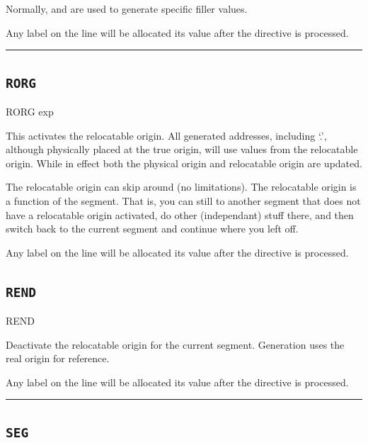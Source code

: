 Normally,  and  are used to generate specific filler
values.

Any label on the  line will be allocated its value after the directive is processed.\\

\hrule



\subsection{\texttt{RORG}}
\label{pseudoop:rorg}

\begin{usage}
  RORG exp
\end{usage}

This activates the relocatable origin.  All generated
addresses, including `.', although physically placed at the
true origin, will use values from the relocatable origin.
While in effect both the physical origin and relocatable origin
are updated.

The relocatable origin can skip around (no limitations).  The
relocatable origin is a function of the segment.  That is, you
can still  to another segment that does not have a
relocatable origin activated, do other (independant) stuff
there, and then switch back to the current segment and continue
where you left off.

Any label on the  line will be allocated its value after the directive is processed.


\subsection{\texttt{REND}}
\label{pseudoop:rend}

\begin{usage}
  REND
\end{usage}


Deactivate the relocatable origin for the current segment.
Generation uses the real origin for reference.

Any label on the  line will be allocated its value after the directive is processed.\\

\hrule



\subsection{\texttt{SEG}}
\label{pseudoop:seg}

